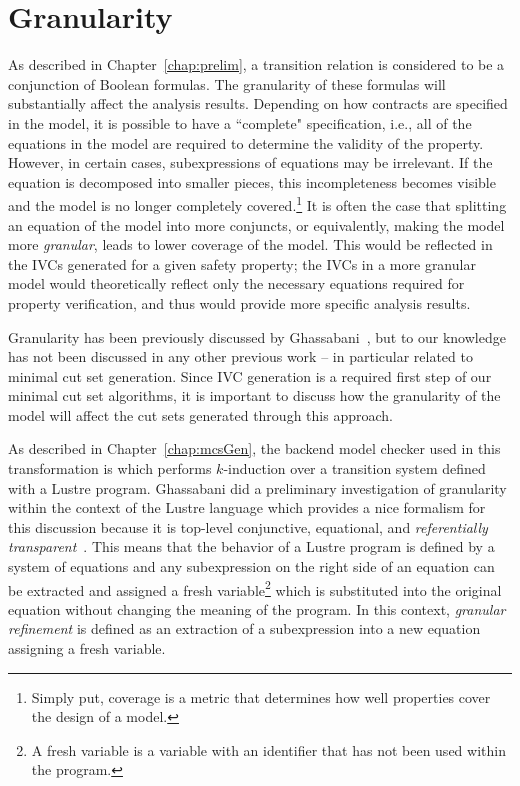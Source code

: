 \chapter{Granularity}
\label{chap:granularity}
As described in Chapter~\ref{chap:prelim}, a transition relation is considered to be a conjunction of Boolean formulas. The granularity of these formulas will substantially affect the analysis results. Depending on how contracts are specified in the model, it is possible to have a ``complete" specification, i.e., all of the equations in the model are required to determine the validity of the property. However, in certain cases, subexpressions of equations may be irrelevant. If the equation is decomposed into smaller pieces, this incompleteness becomes visible and the model is no longer completely covered.\footnote{Simply put, coverage is a metric that determines how well properties cover the design of a model.} It is often the case that splitting an equation of the model into more conjuncts, or equivalently, making the model more \textit{granular}, leads to lower coverage of the model. This would be reflected in the IVCs generated for a given safety property; the IVCs in a more granular model would theoretically reflect only the necessary equations required for property verification, and thus would provide more specific analysis results.

Granularity has been previously discussed by Ghassabani~\cite{ghassabani_2018}, but to our knowledge has not been discussed in any other previous work -- in particular related to minimal cut set generation. Since IVC generation is a required first step of our minimal cut set algorithms, it is important to discuss how the granularity of the model will affect the cut sets generated through this approach. 

As described in Chapter~\ref{chap:mcsGen}, the backend model checker used in this transformation is \jkind which performs $k$-induction over a transition system defined with a Lustre program. Ghassabani did a preliminary investigation of granularity within the context of the Lustre language which provides a nice formalism for this discussion because it is top-level conjunctive, equational, and \textit{referentially transparent}~\cite{Halbwachs91:IEEE}. This means that the behavior of a Lustre program is defined by a system of equations and any subexpression on the right side of an equation can be extracted and assigned a fresh variable\footnote{A fresh variable is a variable with an identifier that has not been used within the program.} which is substituted into the original equation without changing the meaning of the program. In this context, \textit{granular refinement} is defined as an extraction of a subexpression into a new equation assigning a fresh variable. 

